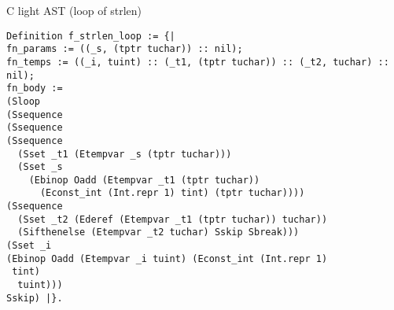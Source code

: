 \documentclass{beamer}
\begin{document}
\begin{frame}[fragile]{C light AST (loop of strlen)}

\begin{lstlisting}[language=Coq]
Definition f_strlen_loop := {|
fn_params := ((_s, (tptr tuchar)) :: nil);
fn_temps := ((_i, tuint) :: (_t1, (tptr tuchar)) :: (_t2, tuchar) :: nil);
fn_body := 
(Sloop
(Ssequence
(Ssequence
(Ssequence
  (Sset _t1 (Etempvar _s (tptr tuchar)))
  (Sset _s
    (Ebinop Oadd (Etempvar _t1 (tptr tuchar))
      (Econst_int (Int.repr 1) tint) (tptr tuchar))))
(Ssequence
  (Sset _t2 (Ederef (Etempvar _t1 (tptr tuchar)) tuchar))
  (Sifthenelse (Etempvar _t2 tuchar) Sskip Sbreak)))
(Sset _i
(Ebinop Oadd (Etempvar _i tuint) (Econst_int (Int.repr 1)
 tint)
  tuint)))
Sskip) |}.

\end{lstlisting}

\end{frame}

\lstlistoflistings
\end{document}
